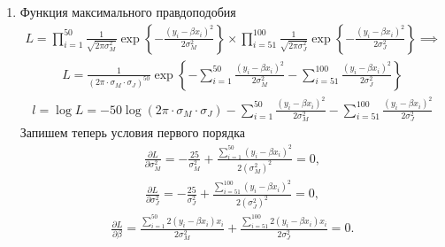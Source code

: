 \documentclass[12pt, a4paper]{article}
\begin{document}
\begin{enumerate}
\item
Функция максимального правдоподобия
\begin{eqnarray}
L = \prod_{i=1}^{50} \frac 1 {\sqrt{2\pi \sigma_M^2}} \exp\left\{-\frac{(y_i - \beta x_i)^2}{2\sigma^2_M}\right\} \times \prod_{i=51}^{100} \frac 1 {\sqrt{2\pi \sigma_J^2}} \exp\left\{-\frac{(y_i - \beta x_i)^2}{2\sigma^2_J}\right\} \implies
\end{eqnarray}
\begin{eqnarray}
L = \frac{1}{(2\pi\cdot \sigma_M\cdot \sigma_J)^{50}} \exp\left\{-\sum_{i=1}^{50} \frac{(y_i - \beta x_i)^2}{2\sigma_M^2} - \sum_{i=51}^{100} \frac{(y_i - \beta x_i)^2}{2\sigma_J^2}\right\}
\end{eqnarray}
\begin{eqnarray}
l = \log L = -50 \log(2\pi \cdot \sigma_M \cdot \sigma_J) -\sum_{i=1}^{50} \frac{(y_i - \beta x_i)^2}{2\sigma_M^2} - \sum_{i=51}^{100} \frac{(y_i - \beta x_i)^2}{2\sigma_J^2}
\end{eqnarray}
Запишем теперь условия первого порядка
\begin{eqnarray}\label{m}
\frac {\partial L}{\partial \sigma_M^2} = -\frac{25}{\sigma_M^2} + \frac{\sum_{i=1}^{50} (y_i - \beta x_i)^2}{2(\sigma_M^2)^{2}} = 0,
\end{eqnarray}
\begin{eqnarray}\label{j}
\frac {\partial L}{\partial \sigma_J^2} = -\frac{25}{\sigma_J^2} + \frac{\sum_{i=51}^{100} (y_i - \beta x_i)^2}{2(\sigma_J^2)^{2}} = 0,
\end{eqnarray}
\begin{eqnarray}
\frac {\partial L}{\partial \beta} = \frac{\sum_{i=1}^{50} 2(y_i - \beta x_i) x_i} {2\sigma_M^2} + \frac{\sum_{i=51}^{100} 2(y_i - \beta x_i) x_i} {2\sigma_J^2} = 0.
\end{eqnarray}


\end{enumerate}
\end{document}
